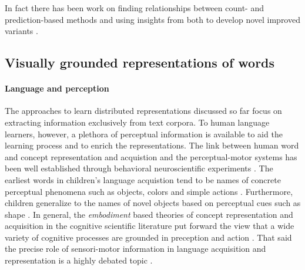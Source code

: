 In fact there has been work on finding relationships between
count- and prediction-based methods \cite{levy2014neural} and
using insights from both to develop novel improved
variants \cite{levy2015improving}.





\subsection{Visually grounded representations of words}
\label{sec:visualwords}

\paragraph{Language and perception}
The approaches to learn distributed representations discussed so far focus on extracting information exclusively
from text corpora. To human language learners, however, a plethora of perceptual information is available to aid the
learning process and to enrich the representations. The link between human word and concept representation
and acquistion and the perceptual-motor systems has been well established through behavioral
neuroscientific experiments \cite{pulvermuller2005brain}.
The earliest words in children's language acquistion tend to be names of concrete perceptual phenomena
such as objects, colors and simple actions \cite{bornstein2004cross}. Furthermore, children generalize to
the names of novel objects based on perceptual cues such as shape \cite{landau1998object}.
In general, the \emph{embodiment} based theories of concept representation and acquisition in the
cognitive scientific literature put forward the view that a wide variety of cognitive processes
are grounded in preception and action \cite{meteyard2008role}. That said the precise role of
sensori-motor information in language acquisition and representation is a highly
debated topic \cite{meteyard2012coming}.

